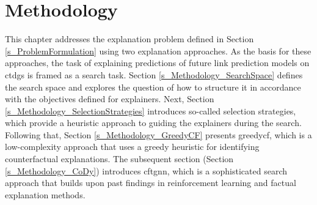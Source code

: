\section{Methodology}
\label{s_Methodology}

This chapter addresses the explanation problem defined in Section \ref{s_ProblemFormulation} using two explanation approaches. As the basis for these approaches, the task of explaining predictions of future link prediction models on \glspl{ctdg} is framed as a search task. Section \ref{s_Methodology_SearchSpace} defines the search space and explores the question of how to structure it in accordance with the objectives defined for explainers. Next, Section \ref{s_Methodology_SelectionStrategies} introduces so-called selection strategies, which provide a heuristic approach to guiding the explainers during the search. Following that, Section \ref{s_Methodology_GreedyCF} presents \gls{greedycf}, which is a low-complexity approach that uses a greedy heuristic for identifying counterfactual explanations. The subsequent section (Section \ref{s_Methodology_CoDy}) introduces \gls{cftgnn}, which is a sophisticated search approach that builds upon past findings in reinforcement learning and factual explanation methods.





